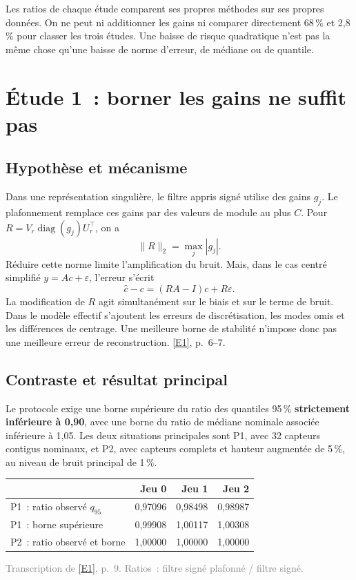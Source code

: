 \documentclass[11pt,a4paper]{article}
\newcommand{\src}[1]{\textcolor{graytext}{\footnotesize #1}}
\DeclareRobustCommand{\eref}[1]{\hyperlink{ref#1}{[#1]}}
\begin{document}
\begin{keybox}
Les ratios de chaque étude comparent ses propres méthodes sur ses propres données.
On ne peut ni additionner les gains ni comparer directement 68\,\% et 2,8\,\% pour classer
les trois études. Une baisse de risque quadratique n'est pas la même chose qu'une baisse
de norme d'erreur, de médiane ou de quantile.
\end{keybox}

\newpage
\section{Étude 1~: borner les gains ne suffit pas}
\subsection*{Hypothèse et mécanisme}
Dans une représentation singulière, le filtre appris signé utilise des gains $g_j$.
Le plafonnement remplace ces gains par des valeurs de module au plus $C$.
Pour $R=V_r\operatorname{diag}(g_j)U_r^\top$, on a
\[
\|R\|_2=\max_j|g_j|.
\]
Réduire cette norme limite l'amplification du bruit. Mais, dans le cas centré simplifié
$y=Ac+\varepsilon$, l'erreur s'écrit
\[
\widehat c-c=(RA-I)c+R\varepsilon.
\]
La modification de $R$ agit simultanément sur le biais et sur le terme de bruit. Dans le modèle
effectif s'ajoutent les erreurs de discrétisation, les modes omis et les différences de centrage.
Une meilleure borne de stabilité n'impose donc pas une meilleure erreur de reconstruction.
\eref{E1}, p.~6--7.

\subsection*{Contraste et résultat principal}
Le protocole exige une borne supérieure du ratio des quantiles 95\,\% \textbf{strictement
inférieure à 0,90}, avec une borne du ratio de médiane nominale associée inférieure à 1,05.
Les deux situations principales sont P1, avec 32 capteurs contigus nominaux, et P2, avec
capteurs complets et hauteur augmentée de 5\,\%, au niveau de bruit principal de 1\,\%.

\begin{center}\small
\begin{tabular}{@{}lrrr@{}}
\toprule
 & \textbf{Jeu 0} & \textbf{Jeu 1} & \textbf{Jeu 2}\\
\midrule
P1~: ratio observé $q_{95}$ & 0,97096 & 0,98498 & 0,98987\\
P1~: borne supérieure & 0,99908 & 1,00117 & 1,00308\\
P2~: ratio observé et borne & 1,00000 & 1,00000 & 1,00000\\
\bottomrule
\end{tabular}\end{center}
\src{Transcription de \eref{E1}, p.~9. Ratios~: filtre signé plafonné / filtre signé.}
\end{document}
